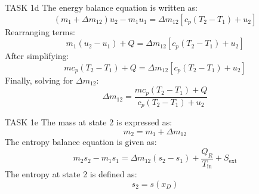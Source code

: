 TASK 1d  
The energy balance equation is written as:  
\[
(m_1 + \Delta m_{12}) u_2 - m_1 u_1 = \Delta m_{12} \left[ c_p (T_2 - T_1) + u_2 \right]
\]  
Rearranging terms:  
\[
m_1 (u_2 - u_1) + Q = \Delta m_{12} \left[ c_p (T_2 - T_1) + u_2 \right]
\]  
After simplifying:  
\[
m c_p (T_2 - T_1) + Q = \Delta m_{12} \left[ c_p (T_2 - T_1) + u_2 \right]
\]  
Finally, solving for \( \Delta m_{12} \):  
\[
\Delta m_{12} = \frac{m c_p (T_2 - T_1) + Q}{c_p (T_2 - T_1) + u_2}
\]  

TASK 1e  
The mass at state 2 is expressed as:  
\[
m_2 = m_1 + \Delta m_{12}
\]  
The entropy balance equation is given as:  
\[
m_2 s_2 - m_1 s_1 = \Delta m_{12} (s_2 - s_1) + \frac{Q_R}{T_{\text{in}}} + S_{\text{ext}}
\]  
The entropy at state 2 is defined as:  
\[
s_2 = s(x_D)
\]  